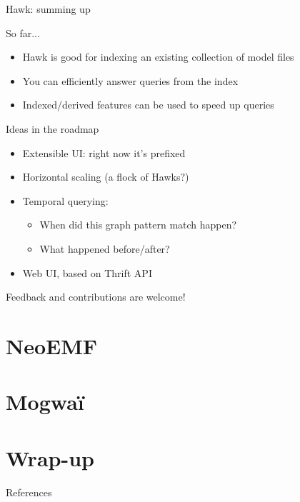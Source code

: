 \begin{frame}{Hawk: summing up}

  \begin{block}{So far...}
    \begin{itemize}
    \item Hawk is good for indexing an existing collection of model files
    \item You can efficiently answer queries from the index
    \item Indexed/derived features can be used to speed up queries
    \end{itemize}
  \end{block}

  \begin{block}{Ideas in the roadmap}
    \begin{itemize}
    \item Extensible UI: right now it's prefixed
    \item Horizontal scaling (a flock of Hawks?)
    \item Temporal querying:
      \begin{itemize}
      \item When did this graph pattern match happen?
      \item What happened before/after?
      \end{itemize}
    \item Web UI, based on Thrift API
    \end{itemize}

    Feedback and contributions are welcome!
  \end{block}

\end{frame}

\section{NeoEMF}

\section{Mogwa\"i}

\section{Wrap-up}

\begin{frame}[allowframebreaks]{References}

  
  

\end{frame}


